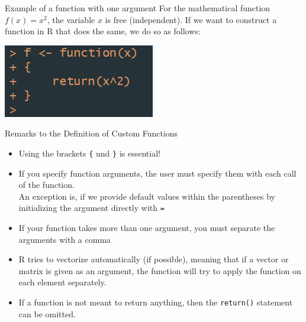 \documentclass[aspectratio = 169]{chariteBeamer}
\begin{document}
\begin{frame}[fragile]{Example of a function with one argument}
  For the mathematical function $f(x) = x^2$, the variable $x$ is free (independent). If we want to construct a function in \textsf R that does the same, we do so as follows: \bigskip \\
  \begin{centering}
    \includegraphics[]{func1.png}
  \end{centering}
\end{frame}

\begin{frame}[fragile]{Remarks to the Definition of Custom Functions}
  \begin{itemize}
    \item Using the brackets \verb+{+ und \verb+}+ is essential!
    \item If you specify function arguments, the user must specify them with each call of the function. \\
An exception is, if we provide default values within the parentheses by initializing the argument directly with \verb+=+
    \item If your function takes more than one argument, you must separate the arguments with a comma 
    \item \textsf R tries to vectorize automatically (if possible), meaning that if a vector or matrix is given as an argument, the function will try to apply the function on each element separately.
    \item If a function is not meant to return anything, then the \verb+return()+ statement can be omitted.
  \end{itemize}
\end{frame}
\end{document}
